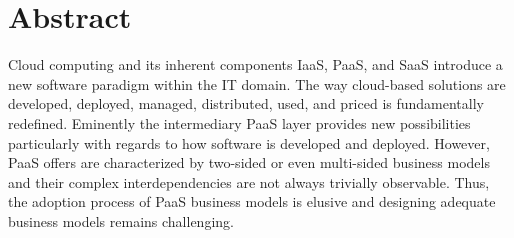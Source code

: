 \chapter*{Abstract}
\thispagestyle{empty}


\begin{comment}
	Author: \myName\\
	Title: \myTitle ~--- \mySubtitle\\
	\myLocation : \myUni , \myTime , \pageref{LastPage} p.\\
	\myDegree , \mySubject\\
	Supervisors: \mySupervisor\\
\end{comment}


Cloud computing and its inherent components \ac{IaaS}, \ac{PaaS}, and \ac{SaaS} introduce a new software paradigm within the \ac{IT} domain. The way cloud-based solutions are developed, deployed, managed, distributed, used, and priced is fundamentally redefined. Eminently the intermediary \ac{PaaS} layer provides new possibilities particularly with regards to how software is developed and deployed. However, \ac{PaaS} offers are characterized by two-sided or even multi-sided business models and their complex interdependencies are not always trivially observable. Thus, the adoption process of \ac{PaaS} business models is elusive and designing adequate business models remains challenging.

